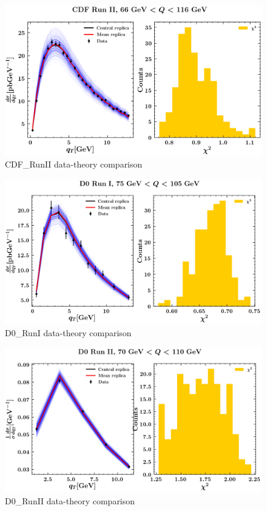 \documentclass[
]{article}
\begin{document}
\begin{figure}
\centering
\includegraphics{pngplots/CDF_RunII.png}
\caption{CDF\_RunII data-theory comparison}
\end{figure}

\begin{figure}
\centering
\includegraphics{pngplots/D0_RunI.png}
\caption{D0\_RunI data-theory comparison}
\end{figure}

\begin{figure}
\centering
\includegraphics{pngplots/D0_RunII.png}
\caption{D0\_RunII data-theory comparison}
\end{figure}
\end{document}
